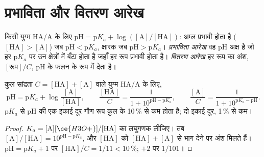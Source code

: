 \section{प्रभाविता और वितरण आरेख}

\begin{definition}[प्रभाविता और वितरण आरेख]\label{def:b1:predominant-reaction:predominance}
किसी युग्म HA/A के लिए $\mathrm{pH} = \mathrm{p}K_a + \log([\mathrm{A}]/[\mathrm{HA}])$:
अम्ल प्रभावी होता है ($[\mathrm{HA}] > [\mathrm{A}]$) जब
$\mathrm{pH} < \mathrm{p}K_a$, क्षारक जब $\mathrm{pH} > \mathrm{p}K_a$।
\emph{प्रभाविता आरेख} वह pH अक्ष है
जो हर $\mathrm{p}K_a$ पर उन क्षेत्रों में बँटा होता है जहाँ हर रूप
प्रभावी होता है। \emph{वितरण आरेख}
हर रूप का अंश, $[\text{रूप}]/C$, pH के फलन के रूप में देता है।
\end{definition}

\begin{proposition}[हेंडरसन संबंध और अंश]\label{prop:b1:predominant-reaction:henderson}
कुल सांद्रता $C = [\mathrm{HA}] + [\mathrm{A}]$ वाले युग्म HA/A के लिए,
\[
  \mathrm{pH} = \mathrm{p}K_a + \log\frac{[\mathrm{A}]}{[\mathrm{HA}]}, \qquad
  \frac{[\mathrm{HA}]}{C} = \frac{1}{1 + 10^{\mathrm{pH} - \mathrm{p}K_a}}, \qquad
  \frac{[\mathrm{A}]}{C} = \frac{1}{1 + 10^{\mathrm{p}K_a - \mathrm{pH}}} .
\]
$\mathrm{p}K_a$ से pH की एक इकाई दूर गौण रूप कुल के
10\,\% से कम होता है; दो इकाई दूर, 1\,\% से कम।
\end{proposition}

\begin{proof}
$K_a = [\mathrm{A}][\ce{H3O+}]/[\mathrm{HA}]$ का लघुगणक लीजिए। तब
$[\mathrm{A}]/[\mathrm{HA}] = 10^{\mathrm{pH}-\mathrm{p}K_a}$, और
$[\mathrm{HA}]$ को $[\mathrm{HA}] + [\mathrm{A}]$ से भाग देने पर अंश मिलते हैं।
$\mathrm{pH} = \mathrm{p}K_a + 1$ पर $[\mathrm{HA}]/C = 1/11 < 10\,\%$;
$+2$ पर $1/101$।
\end{proof}

